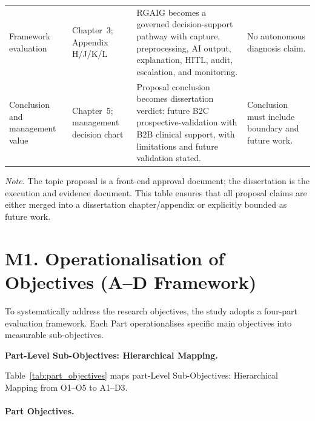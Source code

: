 {\begin{xltabular}{\textwidth}{@{} >{\raggedright\arraybackslash}p{2.4cm} p{2.8cm} p{5.6cm} >{\raggedright\arraybackslash}p{3.4cm} @{}}
\addlinespace
Framework evaluation & Chapter~3; Appendix H/J/K/L & RGAIG becomes a governed decision-support pathway with capture, preprocessing, AI output, explanation, HITL, audit, escalation, and monitoring. & No autonomous diagnosis claim. \\
\addlinespace
Conclusion and management value & Chapter~5; management decision chart & Proposal conclusion becomes dissertation verdict: future B2C prospective-validation with B2B clinical support, with limitations and future validation stated. & Conclusion must include boundary and future work. \\
\end{xltabular}}
\vspace{0.5em}
\noindent\textit{Note.} The topic proposal is a front-end approval document; the dissertation is the execution and evidence document. This table ensures that all proposal claims are either merged into a dissertation chapter/appendix or explicitly bounded as future work.


\section*{M1. Operationalisation of Objectives (A--D Framework)}
\label{sec:appm_operationalization}

To systematically address the research objectives, the study adopts a four-part evaluation framework. Each Part operationalises specific main objectives into measurable sub-objectives.

\noindent\textbf{Part-Level Sub-Objectives: Hierarchical Mapping.}

\noindent Table~\ref{tab:part_objectives} maps part-Level Sub-Objectives: Hierarchical Mapping from O1--O5 to A1--D3.

\clearpage
\paragraph{Part Objectives.} %


